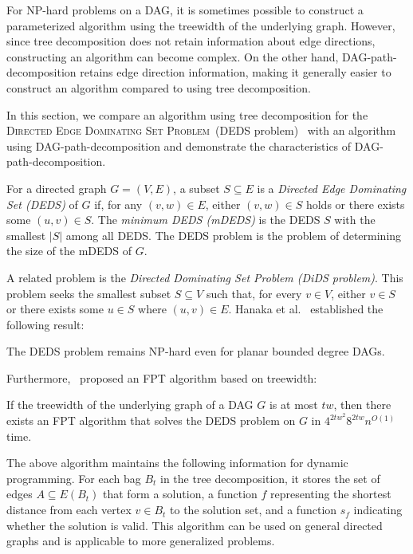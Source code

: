 \documentclass[runningheads]{llncs}
\theoremstyle{plain}
\theoremstyle{definition}
\begin{document}
For NP-hard problems on a DAG, it is sometimes possible to construct a parameterized algorithm using the treewidth of the underlying graph.  
However, since tree decomposition does not retain information about edge directions, constructing an algorithm can become complex.  
On the other hand, DAG-path-decomposition retains edge direction information, making it generally easier to construct an algorithm compared to using tree decomposition.  

In this section, we compare an algorithm using tree decomposition for the \textsc{Directed Edge Dominating Set Problem}~(DEDS problem)~\cite{art22} with an algorithm using DAG-path-decomposition and demonstrate the characteristics of DAG-path-decomposition.  

For a directed graph \(G = (V, E)\), a subset \(S \subseteq E\) is a \emph{Directed Edge Dominating Set (DEDS)} of \(G\) if, for any \((v, w) \in E\), either \((v, w) \in S\) holds or there exists some \((u, v) \in S\).  
The \emph{minimum DEDS (mDEDS)} is the DEDS \(S\) with the smallest \(|S|\) among all DEDS.  
The DEDS problem is the problem of determining the size of the mDEDS of \(G\).  

A related problem is the \emph{Directed Dominating Set Problem (DiDS problem)}.  
This problem seeks the smallest subset \(S \subseteq V\) such that, for every \(v \in V\), either \(v \in S\) or there exists some \(u \in S\) where \((u, v) \in E\).  
Hanaka et al.~\cite{art23} established the following result:  

\begin{proposition}
    The DEDS problem remains NP-hard even for planar bounded degree DAGs.
\end{proposition}

Furthermore,~\cite{art22} proposed an FPT algorithm based on treewidth:  

\begin{proposition}
    If the treewidth of the underlying graph of a DAG \(G\) is at most \(tw\), then there exists an FPT algorithm that solves the DEDS problem on \(G\) in \(4^{2tw^2} 8^{2tw} n^{O(1)}\) time.  
\end{proposition}

The above algorithm maintains the following information for dynamic programming. For each bag \(B_t\) in the tree decomposition, it stores the set of edges \(A \subseteq E(B_t)\) that form a solution, a function \(f\) representing the shortest distance from each vertex \(v \in B_t\) to the solution set, and a function \(s_f\) indicating whether the solution is valid.  
This algorithm can be used on general directed graphs and is applicable to more generalized problems.  
\end{document}
